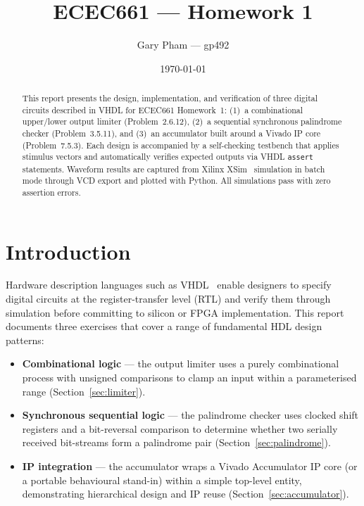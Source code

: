 \documentclass[12pt]{article}
\title{ECEC661 --- Homework 1}
\author{Gary Pham --- gp492}
\date{\today}
\begin{document}
\maketitle
\thispagestyle{fancy}

\begin{abstract}
This report presents the design, implementation, and verification of three
digital circuits described in VHDL for ECEC661 Homework~1:
(1)~a combinational upper/lower output limiter (Problem~2.6.12),
(2)~a sequential synchronous palindrome checker (Problem~3.5.11), and
(3)~an accumulator built around a Vivado IP core (Problem~7.5.3).
Each design is accompanied by a self-checking testbench that applies
stimulus vectors and automatically verifies expected outputs via VHDL
\texttt{assert} statements. Waveform results are captured from Xilinx
XSim~\cite{ug900} simulation in batch mode through VCD export and
plotted with Python. All simulations pass with zero assertion errors.
\end{abstract}

\section{Introduction}
\label{sec:intro}

Hardware description languages such as VHDL~\cite{ieee1076} enable
designers to specify digital circuits at the register-transfer level (RTL)
and verify them through simulation before committing to silicon or FPGA
implementation. This report documents three exercises that cover a range
of fundamental HDL design patterns:

\begin{itemize}[nosep]
  \item \textbf{Combinational logic} --- the output limiter uses a purely
        combinational process with unsigned comparisons to clamp an input
        within a parameterised range (Section~\ref{sec:limiter}).
  \item \textbf{Synchronous sequential logic} --- the palindrome checker
        uses clocked shift registers and a bit-reversal comparison to
        determine whether two serially received bit-streams form a
        palindrome pair (Section~\ref{sec:palindrome}).
  \item \textbf{IP integration} --- the accumulator wraps a Vivado
        Accumulator IP core (or a portable behavioural stand-in) within
        a simple top-level entity, demonstrating hierarchical design and
        IP reuse (Section~\ref{sec:accumulator}).
\end{itemize}
\end{document}
